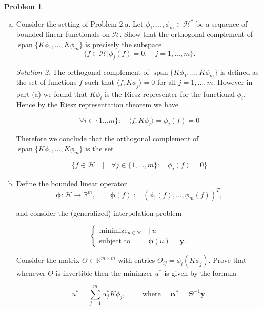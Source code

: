\documentclass[12pt,a4paper]{article}
\theoremstyle{definition}
\newtheorem{problem}{Problem}
\theoremstyle{remark}
\newtheorem*{solution}{Solution}
\begin{document}
\begin{problem}
\begin{enumerate}[(a)]
\begin{solution}
        Since $\phi(f) = \langle K\phi, f \rangle$, $K \phi$ must be the Riesz representer for $\phi$. 
    \end{solution}


    \item Consider the setting of Problem 2.a. Let $\phi_1, \dots, \phi_m \in \mathcal H^*$ be a sequence of bounded linear functionals on $\mathcal H$. Show that the orthogonal complement of $\operatorname{span} \{K \phi_1, \dots, K \phi_m \}$ is precisely the subspace 
    $$\{f \in \mathcal H| \phi_j(f) = 0, \quad j = 1, \dots, m \}.$$
    \begin{solution}
        The orthogonal complement of $\operatorname{span} \{K \phi_1, \dots, K \phi_m \}$ is defined as the set of functions $f$ such that $\langle f, K\phi_j \rangle =0$ for all $j =1, \dots, m$. However in part (a) we found that $K \phi_i$ is the Riesz representer for the functional $\phi_i$. Hence by the Riesz representation theorem we have 

        $$\forall i \in \{1\dots m\}: \quad \langle f, K \phi_j \rangle = \phi_j(f) =0$$

        Therefore we conclude that the orthogonal complement of $\operatorname{span} \{K \phi_1, \dots, K \phi_m \}$ is the set 

        $$\{f \in \mathcal H \quad | \quad \forall j \in \{1, \dots, m\}: \quad \phi_j(f)=0 \}$$
    \end{solution}


    \item Define the bounded linear operator 
    $$\boldsymbol \phi: \mathcal H \rightarrow \mathbb R^m, \qquad \boldsymbol \phi(f) := (\phi_1(f), \dots, \phi_m(f))^T,$$

    and consider the (generalized) interpolation problem 

    $$\begin{cases}
        \operatorname{minimize}_{u \in \mathcal H} & ||u|| \\
        \text{subject to} & \boldsymbol{\phi}(u) = \mathbf y.
    \end{cases}$$

    Consider the matrix $\Theta \in \mathbb R^{m \times m}$ with entries $\Theta_{ij} = \phi_i (K\phi_j)$. Prove that whenever $\Theta$ is invertible then the minimzer $u^*$ is given by the formula

    $$u^* = \sum_{j=1}^m \alpha_j^* K \phi_j, \qquad \text{ where } \quad \boldsymbol \alpha^* = \Theta^{-1} \mathbf y.$$


\end{enumerate}
\end{problem}
\end{document}
